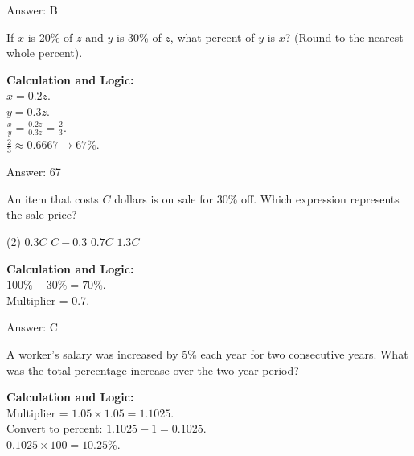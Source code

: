 \documentclass[11pt,paper=a4,answers]{exam}
\begin{document}
\begin{questions}
\begin{solution}
\vspace{30pt}

Answer: \colorbox{yellow!100}{B}
\end{solution}

\vspace{60pt}

\question
If $x$ is 20\% of $z$ and $y$ is 30\% of $z$, what percent of $y$ is $x$? (Round to the nearest whole percent).

\begin{solution}
\textbf{Calculation and Logic:} \\
$x = 0.2z$. \\
$y = 0.3z$. \\
$\frac{x}{y} = \frac{0.2z}{0.3z} = \frac{2}{3}$. \\
$\frac{2}{3} \approx 0.6667 \rightarrow 67\%$.

\vspace{30pt}

Answer: \colorbox{yellow!100}{67}
\end{solution}

\vspace{60pt}

\question
An item that costs $C$ dollars is on sale for 30\% off. Which expression represents the sale price?
\begin{tasks}(2)
    \task $0.3C$
    \task $C - 0.3$
    \task $0.7C$
    \task $1.3C$
\end{tasks}

\begin{solution}
\textbf{Calculation and Logic:} \\
$100\% - 30\% = 70\%$. \\
Multiplier = 0.7.

\vspace{30pt}

Answer: \colorbox{yellow!100}{C}
\end{solution}

\vspace{60pt}

\question
A worker's salary was increased by 5\% each year for two consecutive years. What was the total percentage increase over the two-year period?

\begin{solution}
\textbf{Calculation and Logic:} \\
Multiplier = $1.05 \times 1.05 = 1.1025$. \\
Convert to percent: $1.1025 - 1 = 0.1025$. \\
$0.1025 \times 100 = 10.25\%$.


\end{solution}
\end{questions}
\end{document}
